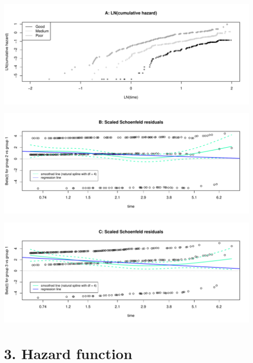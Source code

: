 \documentclass[
]{article}
\begin{document}
\clearpage

\begin{flushleft}\includegraphics[height=0.29\textheight]{Images/PH_assumption-1} \end{flushleft}

\begin{flushleft}\includegraphics[height=0.29\textheight]{Images/PH_assumption-2} \end{flushleft}

\begin{flushleft}\includegraphics[height=0.29\textheight]{Images/PH_assumption-3} \end{flushleft}

\clearpage

\hypertarget{hazard-function}{%
\section{3. Hazard function}\label{hazard-function}}
\end{document}
